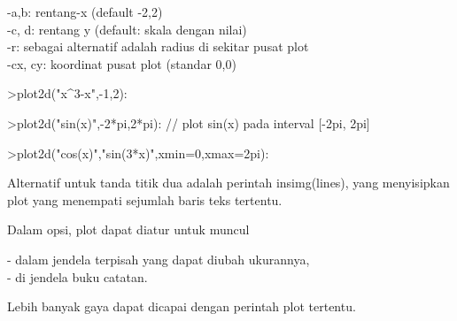 \documentclass[12pt,arial,letterpaper]{book}
\begin{document}
\begin{eulercomment}
\begin{eulercomment}
\begin{eulercomment}
\begin{eulercomment}
\begin{eulercomment}
\begin{eulercomment}
\begin{eulercomment}
\begin{eulercomment}
\begin{eulercomment}
\begin{eulercomment}
\begin{eulercomment}
\begin{eulercomment}
\begin{eulercomment}
\begin{eulercomment}
\begin{eulercomment}
\begin{eulercomment}
\begin{eulercomment}
-a,b: rentang-x (default -2,2)\\
-c, d: rentang y (default: skala dengan nilai)\\
-r: sebagai alternatif adalah radius di sekitar pusat plot\\
-cx, cy: koordinat pusat plot (standar 0,0)
\end{eulercomment}
\begin{eulerprompt}
>plot2d("x^3-x",-1,2):
\end{eulerprompt}
\begin{eulerprompt}
>plot2d("sin(x)",-2*pi,2*pi): // plot sin(x) pada interval [-2pi, 2pi]
\end{eulerprompt}
\begin{eulerprompt}
>plot2d("cos(x)","sin(3*x)",xmin=0,xmax=2pi):
\end{eulerprompt}
\begin{eulercomment}
Alternatif untuk tanda titik dua adalah perintah insimg(lines), yang
menyisipkan plot yang menempati sejumlah baris teks tertentu.

Dalam opsi, plot dapat diatur untuk muncul

-   dalam jendela terpisah yang dapat diubah ukurannya,\\
-   di jendela buku catatan.

Lebih banyak gaya dapat dicapai dengan perintah plot tertentu.


\end{eulercomment}
\end{eulercomment}
\end{eulercomment}
\end{eulercomment}
\end{eulercomment}
\end{eulercomment}
\end{eulercomment}
\end{eulercomment}
\end{eulercomment}
\end{eulercomment}
\end{eulercomment}
\end{eulercomment}
\end{eulercomment}
\end{eulercomment}
\end{eulercomment}
\end{eulercomment}
\end{eulercomment}
\end{document}
